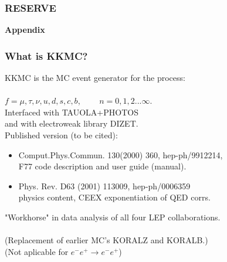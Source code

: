 \documentclass{beamer}
\newcommand{\cbl}{\color{blue}}
\newcommand{\cmg}{\color{magenta}}
\begin{document}
\begin{frame}[fragile]
\frametitle{\bf RESERVE}
\begin{center}
{\Huge\bf Appendix}
\end{center}
\end{frame}


\begin{frame}[fragile]
\frametitle{\bf What is KKMC?}
{\large
KKMC is the MC event generator for the process:\\
~~~~~~~~~~~~~~\fbox{\cbl $e^-e^+ \to f\bar{f}+ n\gamma$}\\
{\cbl $f=\mu,\tau,\nu,u,d,s,c,b$,~~~~ $n=0,1,2...\infty$.}
}\\
Interfaced with TAUOLA+PHOTOS\\
and with electroweak library DIZET.\\

Published version \fbox{\cmg 4.13} (to be cited):
\begin{itemize}
\item
Comput.Phys.Commun. 130(2000) 360, hep-ph/9912214,\\
F77 code description and user guide (manual).
\item
Phys. Rev. D63 (2001) 113009, hep-ph/0006359\\
physics content, CEEX exponentiation of QED corrs.\\
\end{itemize}
"Workhorse" in data analysis of all four LEP collaborations.\\
~~~\\
\footnotesize
(Replacement of earlier MC's KORALZ and KORALB.)\\
(Not aplicable for  $e^-e^+ \to e^-e^+$)

\end{frame}
\end{document}
